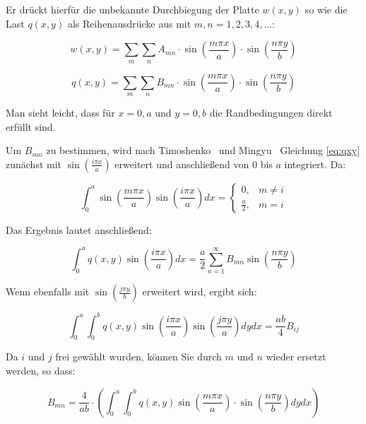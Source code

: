 Er drückt hierfür die unbekannte Durchbiegung der Platte $w(x,y)$ so wie die Last $q(x,y)$ als Reihenausdrücke aus mit $m,n = 1,2,3,4,...$:

\begin{equation} 
w(x,y) = \sum_m \sum_n A_{mn} \cdot \sin\left(\dfrac{m \pi x}{a}\right) \cdot \sin\left(\dfrac{n \pi y}{b}\right)
\label{eq:wxy}
\end{equation} 

\begin{equation} 
q(x,y) = \sum_m \sum_n B_{mn} \cdot \sin\left(\dfrac{m \pi x}{a}\right) \cdot \sin\left(\dfrac{n \pi y}{b}\right)
\label{eq:qxy}
\end{equation} 

Man sieht leicht, dass für $x=0,a$ und $y=0,b$ die Randbedingungen direkt erfüllt sind.

Um $B_{mn}$ zu bestimmen, wird nach Timoshenko~\cite{Timoshenko.1922} und Mingyu~\cite{Mingyu.2019} Gleichung \ref{eq:qxy} zunächst mit $\sin{\left( \frac{i \pi x}{a}\right)}$ erweitert und anschließend von $0$ bis $a$ integriert. Da:

\begin{equation}
	\int_0^a \sin{\left( \frac{m \pi x}{a}\right)} \sin{\left( \frac{i \pi x}{a}\right)} dx = 
	\begin{cases}
	0,&  m\neq i\\
	\frac{a}{2},&   m = i 
	\end{cases}
\end{equation}

Das Ergebnis lautet anschließend:

\begin{equation}
	\int_0^a q(x,y) \sin{\left( \frac{i \pi x}{a}\right)} dx = \frac{a}{2} \sum_{n=1}^\infty B_{mn} \sin{\left( \frac{n \pi y}{b}\right)}
\end{equation}

Wenn ebenfalls mit $\sin{\left( \frac{j \pi y}{b}\right)}$ erweitert wird, ergibt sich:


\begin{equation}
\int_0^a \int_0^b q(x,y) \sin{\left( \frac{i \pi x}{a}\right)} \sin{\left( \frac{j \pi y}{a}\right)} dy dx = \frac{ab}{4}  B_{ij} 
\end{equation}


Da $i$ und $j$ frei gewählt wurden, können Sie durch $m$ und $n$ wieder ersetzt werden, so dass:


\begin{equation}
B_{mn} = \dfrac{4}{ab} \cdot \left( \int_0^a \int_0^b q(x,y) 
\sin\left(\dfrac{m \pi x}{a}\right) \cdot \sin\left( \dfrac{n \pi y}{b}\right) dy dx\right)
\label{eq:Bmn_allgemein}
\end{equation}

